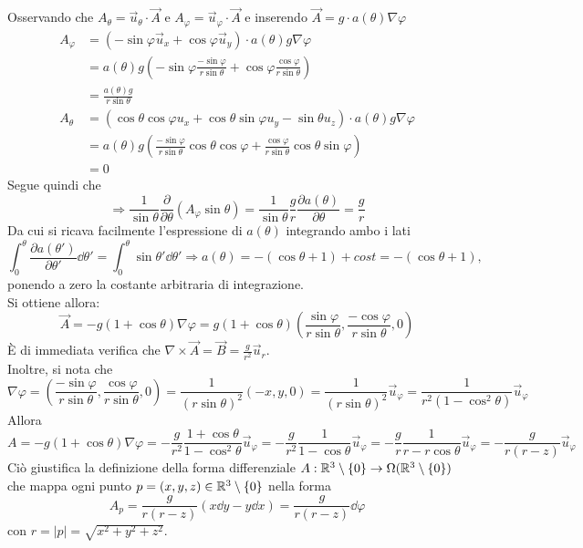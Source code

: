 Osservando che $A_\theta = \vec u _\theta \cdot \vec A $ e
$A_\varphi = \vec u _\varphi \cdot \vec A$ e inserendo $ \vec A = g \cdot a(\theta) \nabla \varphi $
\begin{equation*}
   \begin{aligned}
         A_\varphi & = (-\sin\varphi \vec u _x + \cos\varphi \vec u _y)
                       \cdot a(\theta) g \nabla \varphi \\
                   & = a(\theta)g\left( -\sin\varphi \frac{-\sin\varphi}{r\sin\theta}
                      + \cos\varphi \frac{\cos\varphi}{r\sin\theta}\right)\\
                   & = \frac{a(\theta)g}{r\sin\theta} \\
        A_\theta & = (\cos\theta \cos\varphi u_x + \cos\theta \sin\varphi u_y
                          - \sin\theta u_z) \cdot a(\theta) g \nabla \varphi \\
                 & = a(\theta) g \left( \frac{-\sin\varphi}{r\sin\theta} \cos\theta \cos\varphi
                          + \frac{\cos\varphi}{r\sin\theta} \cos\theta \sin\varphi \right) \\
                 & = 0
   \end{aligned}
\end{equation*}
Segue quindi che
$$
   \Rightarrow
   \frac{1}{\sin\theta} \frac{\partial}{\partial\theta}(A_\varphi \sin\theta)
      = \frac{1}{\sin\theta} \frac{g}{r} \frac{\partial a(\theta)}{\partial \theta}
      = \frac{g}{r}
$$
Da cui si ricava facilmente l'espressione di $a(\theta)$ integrando ambo i lati
$$
   \int_0 ^\theta \frac{\partial a(\theta')}{\partial \theta'} \dd \theta'
      = \int_0^\theta \sin\theta' \dd \theta'
   \Rightarrow a(\theta) = -(\cos\theta+1) + cost  = -(\cos\theta+1),
$$
ponendo a zero la costante arbitraria di integrazione.\\
%
Si ottiene allora:
$$
   \boxed{
          \vec A = -g(1 + \cos\theta) \nabla \varphi
                 = g(1 + \cos\theta)\left( \frac{\sin\varphi}{r\sin\theta},
                    \frac{-\cos\varphi}{r\sin\theta},0 \right)
   }
$$
È di immediata verifica che $\nabla \times \vec A = \vec B = \frac{g}{r^2} \vec u _r$.\\
%
Inoltre, si nota che
$$
   \nabla \varphi = \left( \frac{-\sin\varphi}{r\sin\theta},\frac{\cos\varphi}{r\sin\theta},0 \right)
      = \frac{1}{(r\sin\theta)^2}(-x,y,0) = \frac{1}{(r\sin\theta)^2}\vec u _\varphi
      = \frac{1}{r^2(1-\cos^2\theta)} \vec u _\varphi
$$
Allora
$$
   A = -g(1+\cos\theta)\nabla\varphi = -\frac{g}{r^2} \frac{1+\cos\theta}{1-\cos^2\theta} \vec u _\varphi
     = -\frac{g}{r^2} \frac{1}{1-\cos\theta} \vec u _\varphi
     = -\frac{g}{r} \frac{1}{r-r\cos\theta} \vec u _\varphi
     = -\frac{g}{r(r-z)} \vec u _\varphi
$$
Ciò giustifica la definizione della forma differenziale $ A : \mathbb{R}^3 \setminus \{0\}
\to \Omega(\mathbb{R}^3 \setminus \{0\})$ che mappa ogni punto $p = (x,y,z) \in \mathbb{R}^3 \setminus \{0\}$ nella forma
$$
    A_p = \frac{g}{r(r-z)}(x \dd  y - y \dd  x) = \frac{g}{r(r-z)} \dd  \varphi
$$
con $r = |p| = \sqrt{x^2+y^2+z^2}$.

